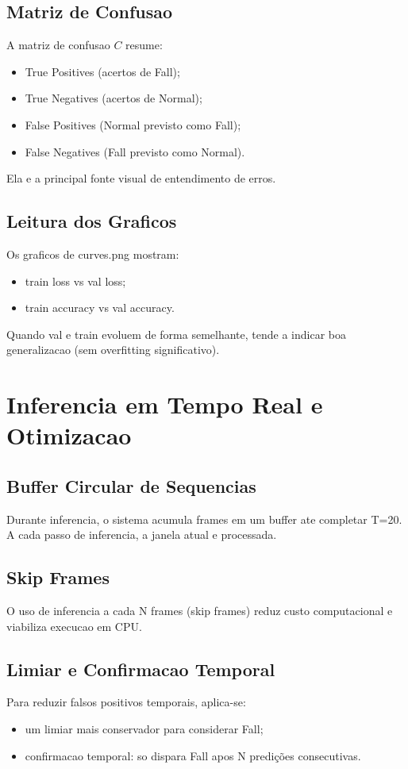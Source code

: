 \subsection{Matriz de Confusao}
A matriz de confusao $C$ resume:
\begin{itemize}
  \item True Positives (acertos de Fall);
  \item True Negatives (acertos de Normal);
  \item False Positives (Normal previsto como Fall);
  \item False Negatives (Fall previsto como Normal).
\end{itemize}
Ela e a principal fonte visual de entendimento de erros.

\subsection{Leitura dos Graficos}
Os graficos de curves.png mostram:
\begin{itemize}
  \item train loss vs val loss;
  \item train accuracy vs val accuracy.
\end{itemize}
Quando val e train evoluem de forma semelhante, tende a indicar boa generalizacao (sem overfitting significativo).

\section{Inferencia em Tempo Real e Otimizacao}

\subsection{Buffer Circular de Sequencias}
Durante inferencia, o sistema acumula frames em um buffer ate completar T=20. A cada passo de inferencia, a janela atual e processada.

\subsection{Skip Frames}
O uso de inferencia a cada N frames (skip frames) reduz custo computacional e viabiliza execucao em CPU.

\subsection{Limiar e Confirmacao Temporal}
Para reduzir falsos positivos temporais, aplica-se:
\begin{itemize}
  \item um limiar mais conservador para considerar Fall;
  \item confirmacao temporal: so dispara Fall apos N predições consecutivas.
\end{itemize}

